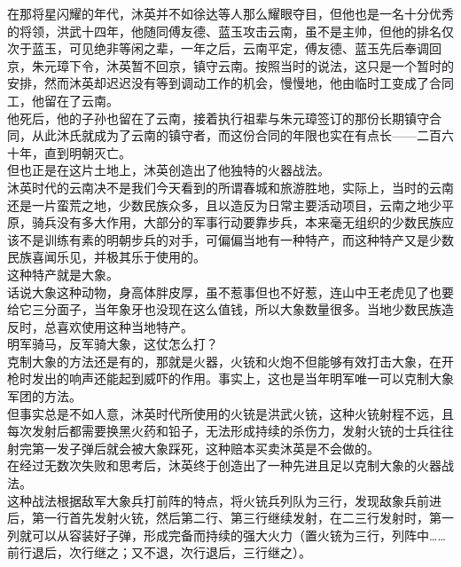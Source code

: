 \begin{multicols}{\theparacolNo}
在那将星闪耀的年代，沐英并不如徐达等人那么耀眼夺目，但他也是一名十分优秀的将领，洪武十四年，他随同傅友德、蓝玉攻击云南，虽不是主帅，但他的排名仅次于蓝玉，可见绝非等闲之辈，一年之后，云南平定，傅友德、蓝玉先后奉调回京，朱元璋下令，沐英暂不回京，镇守云南。按照当时的说法，这只是一个暂时的安排，然而沐英却迟迟没有等到调动工作的机会，慢慢地，他由临时工变成了合同工，他留在了云南。\\

他死后，他的子孙也留在了云南，接着执行祖辈与朱元璋签订的那份长期镇守合同，从此沐氏就成为了云南的镇守者，而这份合同的年限也实在有点长——二百六十年，直到明朝灭亡。\\

但也正是在这片土地上，沐英创造出了他独特的火器战法。\\

沐英时代的云南决不是我们今天看到的所谓春城和旅游胜地，实际上，当时的云南还是一片蛮荒之地，少数民族众多，且以造反为日常主要活动项目，云南之地少平原，骑兵没有多大作用，大部分的军事行动要靠步兵，本来毫无组织的少数民族应该不是训练有素的明朝步兵的对手，可偏偏当地有一种特产，而这种特产又是少数民族喜闻乐见，并极其乐于使用的。\\

这种特产就是大象。\\

话说大象这种动物，身高体胖皮厚，虽不惹事但也不好惹，连山中王老虎见了也要给它三分面子，当年象牙也没现在这么值钱，所以大象数量很多。当地少数民族造反时，总喜欢使用这种当地特产。\\

明军骑马，反军骑大象，这仗怎么打？\\

克制大象的方法还是有的，那就是火器，火铳和火炮不但能够有效打击大象，在开枪时发出的响声还能起到威吓的作用。事实上，这也是当年明军唯一可以克制大象军团的方法。\\

但事实总是不如人意，沐英时代所使用的火铳是洪武火铳，这种火铳射程不远，且每次发射后都需要换黑火药和铅子，无法形成持续的杀伤力，发射火铳的士兵往往射完第一发子弹后就会被大象踩死，这种赔本买卖沐英是不会做的。\\

在经过无数次失败和思考后，沐英终于创造出了一种先进且足以克制大象的火器战法。\\

这种战法根据敌军大象兵打前阵的特点，将火铳兵列队为三行，发现敌象兵前进后，第一行首先发射火铳，然后第二行、第三行继续发射，在二三行发射时，第一列就可以从容装好子弹，形成完备而持续的强大火力（置火铳为三行，列阵中……前行退后，次行继之；又不退，次行退后，三行继之）。\\


\end{multicols}
